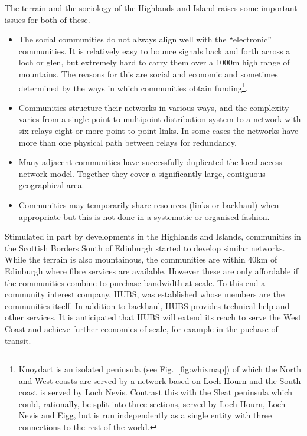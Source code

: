 The terrain and the sociology of the Highlands and Island raises some important issues for both of these.
\begin{itemize}
\item The social communities do not always align well with the ``electronic'' communities. It is relatively easy to bounce signals back and forth across a loch or glen, but extremely hard to carry them over a 1000m high range of mountains. The reasons for this are social and economic and sometimes determined by the ways in which communities obtain funding\footnote{Knoydart is an isolated peninsula (see Fig.~\ref{fig:whixmap})  of which the North and West coasts are served by a network based on Loch Hourn and the South coast is served by Loch Nevis.  Contrast this with the Sleat peninsula which could, rationally,  be split into three sections, served by Loch Hourn, Loch Nevis and Eigg, but is run independently as a single entity with three connections to the rest of the world.}.
\item Communities structure their networks in various ways, and the complexity varies from a single point-to multipoint distribution system to a network with six relays  eight or more point-to-point links.  In some cases the networks have more than one physical path between relays for redundancy.
\item Many adjacent communities have successfully duplicated the local access network model. Together they cover a significantly large, contiguous geographical area.
\item Communities may temporarily share resources (links or backhaul) when appropriate but this is not done in a systematic or organised fashion.
\end{itemize}
Stimulated in part by developments in the Highlands and Islands, communities in the Scottish Borders South of Edinburgh started  to develop similar networks.  While the terrain is also mountainous, the communities are within 40km of Edinburgh where fibre services are available.   However these are only affordable if the communities combine to purchase bandwidth at scale. To this end a community interest company, HUBS, was established whose members are the communities itself.  In addition to backhaul, HUBS provides technical help and other services.  It is anticipated that HUBS will extend its reach to serve the West Coast and achieve further economies of scale, for example in the puchase of transit.
